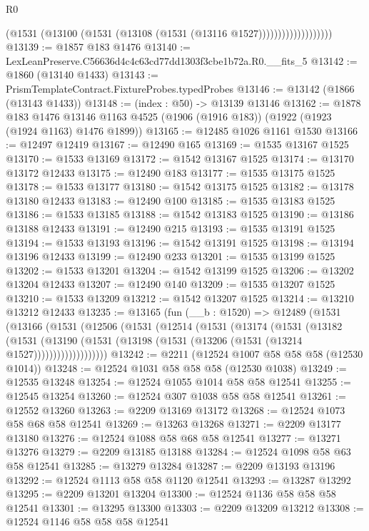 \begin{lexlean}{R0}
\begin{coremodule}
                              (@1531 (@13100 (@1531 (@13108 (@1531 (@13116 @1527)))))))))))))))))))
@13139 := @1857 @183 @1476
@13140 := LexLeanPreserve.C56636d4c4c63cd77dd1303f3cbe1b72a.R0.__fits_5
@13142 := @1860 (@13140 @1433)
@13143 := PrismTemplateContract.FixtureProbes.typedProbes
@13146 := @13142 (@1866 (@13143 @1433))
@13148 := (index : @50) -> @13139 @13146
@13162 := @1878
    @183
    @1476
    @13146
    @1163
    @4525
    (@1906 (@1916 @183))
    (@1922 (@1923 (@1924 @1163) @1476 @1899))
@13165 := @12485 @1026 @1161 @1530
@13166 := @12497 @12419
@13167 := @12490 @165
@13169 := @1535 @13167 @1525
@13170 := @1533 @13169
@13172 := @1542 @13167 @1525
@13174 := @13170 @13172 @12433
@13175 := @12490 @183
@13177 := @1535 @13175 @1525
@13178 := @1533 @13177
@13180 := @1542 @13175 @1525
@13182 := @13178 @13180 @12433
@13183 := @12490 @100
@13185 := @1535 @13183 @1525
@13186 := @1533 @13185
@13188 := @1542 @13183 @1525
@13190 := @13186 @13188 @12433
@13191 := @12490 @215
@13193 := @1535 @13191 @1525
@13194 := @1533 @13193
@13196 := @1542 @13191 @1525
@13198 := @13194 @13196 @12433
@13199 := @12490 @233
@13201 := @1535 @13199 @1525
@13202 := @1533 @13201
@13204 := @1542 @13199 @1525
@13206 := @13202 @13204 @12433
@13207 := @12490 @140
@13209 := @1535 @13207 @1525
@13210 := @1533 @13209
@13212 := @1542 @13207 @1525
@13214 := @13210 @13212 @12433
@13235 := @13165
    (fun (__b : @1520) =>
    @12489
      (@1531
        (@13166
          (@1531
            (@12506
              (@1531
                (@12514
                  (@1531
                    (@13174
                      (@1531
                        (@13182
                          (@1531
                            (@13190
                              (@1531 (@13198 (@1531 (@13206 (@1531 (@13214 @1527)))))))))))))))))))
@13242 := @2211 (@12524 @1007 @58 @58 @58 (@12530 @1014))
@13248 := @12524 @1031 @58 @58 @58 (@12530 @1038)
@13249 := @12535 @13248
@13254 := @12524 @1055 @1014 @58 @58 @12541
@13255 := @12545 @13254
@13260 := @12524 @307 @1038 @58 @58 @12541
@13261 := @12552 @13260
@13263 := @2209 @13169 @13172
@13268 := @12524 @1073 @58 @68 @58 @12541
@13269 := @13263 @13268
@13271 := @2209 @13177 @13180
@13276 := @12524 @1088 @58 @68 @58 @12541
@13277 := @13271 @13276
@13279 := @2209 @13185 @13188
@13284 := @12524 @1098 @58 @63 @58 @12541
@13285 := @13279 @13284
@13287 := @2209 @13193 @13196
@13292 := @12524 @1113 @58 @58 @1120 @12541
@13293 := @13287 @13292
@13295 := @2209 @13201 @13204
@13300 := @12524 @1136 @58 @58 @58 @12541
@13301 := @13295 @13300
@13303 := @2209 @13209 @13212
@13308 := @12524 @1146 @58 @58 @58 @12541

\end{coremodule}
\end{lexlean}
